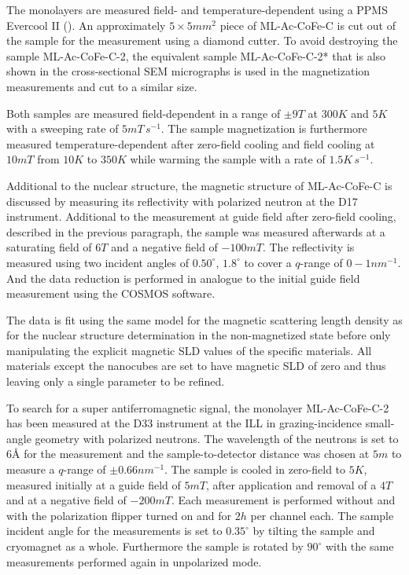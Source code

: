\documentclass[\main/dresen_thesis.tex]{subfiles}
\begin{document}
    The monolayers are measured field- and temperature-dependent using a PPMS Evercool II ().
    An approximately $5 \times 5 \unit{mm^2}$ piece of ML-Ac-CoFe-C is cut out of the sample for the measurement using a diamond cutter.
    To avoid destroying the sample ML-Ac-CoFe-C-2, the equivalent sample ML-Ac-CoFe-C-2* that is also shown in the cross-sectional SEM micrographs is used in the magnetization measurements and cut to a similar size.

    Both samples are measured field-dependent in a range of $\pm 9 \unit{T}$ at $300 \unit{K}$ and $5 \unit{K}$ with a sweeping rate of $5 \unit{mT \, s^{-1}}$.
    The sample magnetization is furthermore measured temperature-dependent after zero-field cooling and field cooling at $10 \unit{mT}$ from $10 \unit{K}$ to $350 \unit{K}$ while warming the sample with a rate of $1.5 \unit{K \, s^{-1}}$.

    Additional to the nuclear structure, the magnetic structure of ML-Ac-CoFe-C is discussed by measuring its reflectivity with polarized neutron at the D17 instrument.
    Additional to the measurement at guide field after zero-field cooling, described in the previous paragraph, the sample was measured afterwards at a saturating field of $6 \unit{T}$ and a negative field of $-100 \unit{mT}$.
    The reflectivity is measured using two incident angles of $0.50^\circ ,\, 1.8^\circ$ to cover a $q$-range of $0 - 1 \unit{nm^{-1}}$.
    And the data reduction is performed in analogue to the initial guide field measurement using the COSMOS software.

    The data is fit using the same model for the magnetic scattering length density as for the nuclear structure determination in the non-magnetized state before only manipulating the explicit magnetic SLD values of the specific materials.
    All materials except the nanocubes are set to have magnetic SLD of zero and thus leaving only a single parameter to be refined.


    To search for a super antiferromagnetic signal, the monolayer ML-Ac-CoFe-C-2 has been measured at the D33 instrument at the ILL in grazing-incidence small-angle geometry with polarized neutrons.
    The wavelength of the neutrons is set to $6 \unit{\angstrom}$ for the measurement and the sample-to-detector distance was chosen at $5 \unit{m}$ to measure a $q$-range of $\pm 0.66 \unit{nm^{-1}}$.
    The sample is cooled in zero-field to $5 \unit{K}$, measured initially at a guide field of $5 \unit{mT}$, after application and removal of a $4 \unit{T}$ and at a negative field of $-200 \unit{mT}$.
    Each measurement is performed without and with the polarization flipper turned on and for $2 \unit{h}$ per channel each.
    The sample incident angle for the measurements is set to $0.35 ^\circ$ by tilting the sample and cryomagnet as a whole.
    Furthermore the sample is rotated by $90 ^\circ$ with the same measurements performed again in unpolarized mode.
\end{document}
